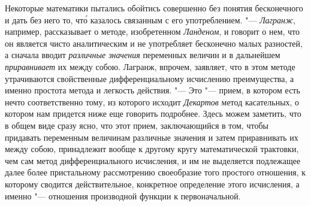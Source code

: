 Некоторые математики пытались обойтись совершенно без понятия бесконечного и
дать без него то, чт\'{о} казалось связанным с его употреблением. "---
{\em Лагранж}, например, рассказывает о методе,
изобретенном {\em Ланденом}, и говорит о нем, что он
является чисто аналитическим и не употребляет бесконечно малых разностей, а
сначала вводит {\em различные значения} переменных
величин и в дальнейшем {\em приравнивает} их между
собою. Лагранж, впрочем, заявляет, что в этом методе утрачиваются
свойственные дифференциальному исчислению преимущества, а именно простота
метода и легкость действия. "--- Это "--- прием, в котором есть нечто
соответственно тому, из которого исходит {\em Декартов}
метод касательных, о котором нам придется ниже еще говорить подробнее.
Здесь можем заметить, что в общем виде сразу ясно, что этот прием,
заключающийся в том, чтобы придавать переменным величинам различные
значения и затем приравнивать их между собою, принадлежит вообще к другому
кругу математической трактовки, чем сам метод дифференциального исчисления,
и им не выделяется подлежащее далее более пристальному рассмотрению
своеобразие того простого отношения, к которому сводится действительное,
конкретное определение этого исчисления, а именно "--- отношения производной
функции к первоначальной.

